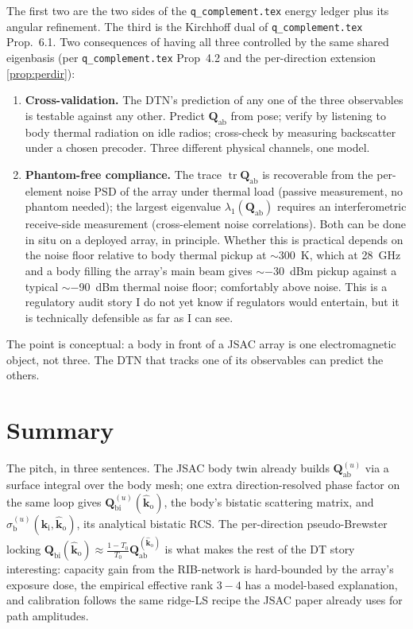 \documentclass[11pt,a4paper]{article}
\theoremstyle{definition}
\DeclareMathOperator{\tr}{tr}
\newcommand{\Qabs}{\mathbf{Q}_{\mathrm{ab}}}
\newcommand{\kin}{\hat{\bm{k}}_{\mathrm{i}}}
\newcommand{\kout}{\hat{\bm{k}}_{\mathrm{o}}}
\newcommand{\sigb}{\sigma_{\mathrm{b}}}
\newcommand{\Qbist}{\mathbf{Q}_{\mathrm{bi}}}
\begin{document}
\noindent The first two are the two sides of the
\texttt{q\_complement.tex} energy ledger plus its angular
refinement.  The third is the Kirchhoff dual of
\texttt{q\_complement.tex} Prop.~6.1.  Two consequences of having
all three controlled by the same shared eigenbasis (per
\texttt{q\_complement.tex} Prop~4.2 and the per-direction extension
\cref{prop:perdir}):

\begin{enumerate}[leftmargin=1.6em,itemsep=2pt]
\item \textbf{Cross-validation.}  The DTN's prediction of any one
of the three observables is testable against any other.  Predict
$\Qabs$ from pose; verify by listening to body thermal radiation on
idle radios; cross-check by measuring backscatter under a chosen
precoder.  Three different physical channels, one model.
\item \textbf{Phantom-free compliance.}  The trace
$\tr\Qabs$ is recoverable from the per-element noise
PSD of the array under thermal load (passive measurement, no
phantom needed); the largest eigenvalue $\lambda_1(\Qabs)$ requires
an interferometric receive-side measurement (cross-element noise
correlations).  Both can be done in situ on a deployed array, in
principle.  Whether this is practical depends on the noise floor
relative to body thermal pickup at $\sim$\SI{300}{K}, which at
\SI{28}{GHz} and a body filling the array's main beam gives
$\sim$\SI{-30}{dBm} pickup against a typical $\sim$\SI{-90}{dBm}
thermal noise floor; comfortably above noise.  This is a regulatory
audit story I do not yet know if regulators would entertain, but it
is technically defensible as far as I can see.
\end{enumerate}

The point is conceptual: a body in front of a JSAC array is one
electromagnetic object, not three.  The DTN that tracks one of its
observables can predict the others.

\section{Summary}\label{sec:sum}

The pitch, in three sentences.  The JSAC body twin already builds
$\Qabs^{(u)}$ via a surface integral over the body mesh; one
extra direction-resolved phase factor on the same loop gives
$\Qbist^{(u)}(\kout)$, the body's bistatic scattering matrix, and
$\sigb^{(u)}(\kin,\kout)$, its analytical bistatic RCS.  The
per-direction pseudo-Brewster locking
$\Qbist(\kout)\approx\frac{1-T_0}{T_0}\Qabs^{(\kout)}$ is what
makes the rest of the DT story interesting: capacity gain from the
RIB-network is hard-bounded by the array's exposure dose, the
empirical effective rank $3{-}4$ has a model-based explanation, and
calibration follows the same ridge-LS recipe the JSAC paper already
uses for path amplitudes.
\end{document}
